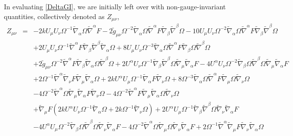 \documentclass[10pt,letterpaper]{article}
\numberwithin{equation}{section}
\begin{document}
%
%
In evaluating \eqref{DeltaGI}, we are initially left over with non-gauge-invariant quantities, collectively denoted as $Z_{\mu\nu}$,
\begin{eqnarray}
Z_{\mu\nu}&=& -2 k U_{\mu } U_{\nu } \Omega^{-1} \tilde{\nabla}_{\alpha }\Omega \tilde{\nabla}^{\alpha }F - 2 \tilde{g}_{\mu \nu } \Omega^{-2} \tilde{\nabla}_{\alpha }\Omega \tilde{\nabla}^{\alpha }F \tilde{\nabla}_{\beta }\tilde{\nabla}^{\beta }\Omega - 10 U_{\mu } U_{\nu } \Omega^{-2} \tilde{\nabla}_{\alpha }\Omega \tilde{\nabla}^{\alpha }F \tilde{\nabla}_{\beta }\tilde{\nabla}^{\beta }\Omega \nonumber \\ 
&& + 2 U_{\mu } U_{\nu } \Omega^{-1} \tilde{\nabla}^{\alpha }F \tilde{\nabla}_{\beta }\tilde{\nabla}^{\beta }\tilde{\nabla}_{\alpha }\Omega + 8 U_{\mu } U_{\nu } \Omega^{-3} \tilde{\nabla}_{\alpha }\Omega \tilde{\nabla}^{\alpha }F \tilde{\nabla}_{\beta }\Omega \tilde{\nabla}^{\beta }\Omega \nonumber \\ 
&& + 2 \tilde{g}_{\mu \nu } \Omega^{-2} \tilde{\nabla}^{\alpha }F \tilde{\nabla}_{\beta }\tilde{\nabla}_{\alpha }\Omega \tilde{\nabla}^{\beta }\Omega + 2 U^{\alpha } U_{\nu } \Omega^{-1} \tilde{\nabla}_{\beta }\tilde{\nabla}^{\beta }\Omega \tilde{\nabla}_{\mu }\tilde{\nabla}_{\alpha }F - 4 U^{\alpha } U_{\nu } \Omega^{-2} \tilde{\nabla}_{\beta }\Omega \tilde{\nabla}^{\beta }\Omega \tilde{\nabla}_{\mu }\tilde{\nabla}_{\alpha }F \nonumber \\ 
&& + 2 \Omega^{-1} \tilde{\nabla}^{\alpha }\tilde{\nabla}_{\nu }F \tilde{\nabla}_{\mu }\tilde{\nabla}_{\alpha }\Omega + 2 k U^{\alpha } U_{\mu } \Omega^{-1} \tilde{\nabla}_{\alpha }F \tilde{\nabla}_{\nu }\Omega + 8 \Omega^{-3} \tilde{\nabla}_{\alpha }\Omega \tilde{\nabla}^{\alpha }F \tilde{\nabla}_{\mu }\Omega \tilde{\nabla}_{\nu }\Omega \nonumber \\ 
&& - 4 \Omega^{-2} \tilde{\nabla}^{\alpha }\Omega \tilde{\nabla}_{\mu }\tilde{\nabla}_{\alpha }F \tilde{\nabla}_{\nu }\Omega - 4 \Omega^{-2} \tilde{\nabla}^{\alpha }F \tilde{\nabla}_{\mu }\tilde{\nabla}_{\alpha }\Omega \tilde{\nabla}_{\nu }\Omega \nonumber \\ 
&& + \tilde{\nabla}_{\mu }F (2 k U^{\alpha } U_{\nu } \Omega^{-1} \tilde{\nabla}_{\alpha }\Omega + 2 k \Omega^{-1} \tilde{\nabla}_{\nu }\Omega) + 2 U^{\alpha } U_{\mu } \Omega^{-1} \tilde{\nabla}_{\beta }\tilde{\nabla}^{\beta }\Omega \tilde{\nabla}_{\nu }\tilde{\nabla}_{\alpha }F \nonumber \\ 
&& - 4 U^{\alpha } U_{\mu } \Omega^{-2} \tilde{\nabla}_{\beta }\Omega \tilde{\nabla}^{\beta }\Omega \tilde{\nabla}_{\nu }\tilde{\nabla}_{\alpha }F - 4 \Omega^{-2} \tilde{\nabla}^{\alpha }\Omega \tilde{\nabla}_{\mu }\Omega \tilde{\nabla}_{\nu }\tilde{\nabla}_{\alpha }F + 2 \Omega^{-1} \tilde{\nabla}^{\alpha }\tilde{\nabla}_{\mu }F \tilde{\nabla}_{\nu }\tilde{\nabla}_{\alpha }\Omega \nonumber \\ 

\end{eqnarray}
\end{document}
